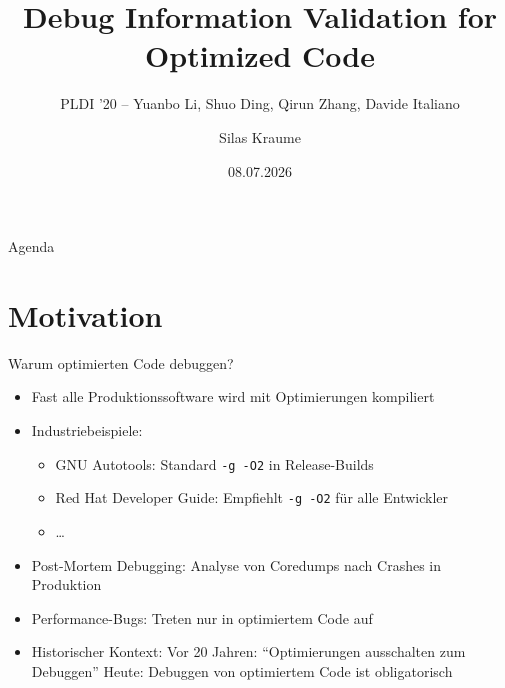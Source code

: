﻿\documentclass{beamer}
\title{Debug Information Validation for Optimized Code}
\subtitle{PLDI '20 -- Yuanbo Li, Shuo Ding, Qirun Zhang, Davide Italiano}
\author{Silas Kraume}
\institute{Heinrich-Heine-Universit\"at D\"usseldorf}
\date{08.07.2026}
\begin{document}
\maketitle


\begin{frame}[noframenumbering]{Agenda}
  \tableofcontents
\end{frame}

\section{Motivation}


\begin{frame}{Warum optimierten Code debuggen?}
  \begin{itemize}
    \item Fast alle Produktionssoftware wird mit Optimierungen kompiliert
    \item Industriebeispiele:
      \begin{itemize}
        \item GNU Autotools: Standard \texttt{-g -O2} in Release-Builds
        \item Red Hat Developer Guide: Empfiehlt \texttt{-g -O2} f\"ur alle Entwickler
        \item \dots
      \end{itemize}
    \item Post-Mortem Debugging: Analyse von Coredumps nach Crashes in Produktion
    \item Performance-Bugs: Treten nur in optimiertem Code auf
    \item Historischer Kontext: Vor 20 Jahren: ``Optimierungen ausschalten zum Debuggen''  Heute: Debuggen von optimiertem Code ist obligatorisch
  \end{itemize}
\end{frame}
\end{document}
